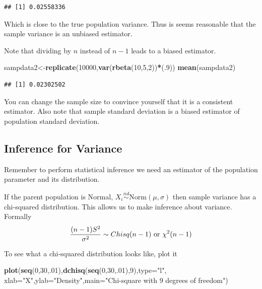 \documentclass[]{book}
\newenvironment{Shaded}{\begin{snugshade}}{\end{snugshade}}
\newcommand{\KeywordTok}[1]{\textcolor[rgb]{0.13,0.29,0.53}{\textbf{#1}}}
\newcommand{\DataTypeTok}[1]{\textcolor[rgb]{0.13,0.29,0.53}{#1}}
\newcommand{\DecValTok}[1]{\textcolor[rgb]{0.00,0.00,0.81}{#1}}
\newcommand{\StringTok}[1]{\textcolor[rgb]{0.31,0.60,0.02}{#1}}
\newcommand{\OperatorTok}[1]{\textcolor[rgb]{0.81,0.36,0.00}{\textbf{#1}}}
\newcommand{\NormalTok}[1]{#1}
\theoremstyle{definition}
\theoremstyle{definition}
\theoremstyle{definition}
\theoremstyle{remark}
\begin{document}
\begin{verbatim}
## [1] 0.02558336
\end{verbatim}

Which is close to the true population variance. Thus is seems reasonable
that the sample variance is an unbiased estimator.

Note that dividing by \(n\) instead of \(n-1\) leads to a biased
estimator.

\begin{Shaded}
\begin{Highlighting}[]
\NormalTok{sampdata2<-}\KeywordTok{replicate}\NormalTok{(}\DecValTok{10000}\NormalTok{,}\KeywordTok{var}\NormalTok{(}\KeywordTok{rbeta}\NormalTok{(}\DecValTok{10}\NormalTok{,}\DecValTok{5}\NormalTok{,}\DecValTok{2}\NormalTok{))}\OperatorTok{*}\NormalTok{(.}\DecValTok{9}\NormalTok{))}
\KeywordTok{mean}\NormalTok{(sampdata2)}
\end{Highlighting}
\end{Shaded}

\begin{verbatim}
## [1] 0.02302502
\end{verbatim}

You can change the sample size to convince yourself that it is a
consistent estimator. Also note that sample standard deviation is a
biased estimator of population standard deviation.

\subsection{Inference for Variance}\label{inference-for-variance}

Remember to perform statistical inference we need an estimator of the
population parameter and its distribution.

If the parent population is Normal,
\(X_{i}\overset{iid}{\sim}\mbox{Norm}(\mu,\sigma)\) then sample variance
has a chi-squared distribution. This allows us to make inference about
variance. Formally
\[{(n-1)S^{2} \over \sigma ^{2}} \sim Chisq(n-1) \mbox{ or } \chi^{2}(n-1)\]

To see what a chi-squared distribution looks like, plot it

\begin{Shaded}
\begin{Highlighting}[]
\KeywordTok{plot}\NormalTok{(}\KeywordTok{seq}\NormalTok{(}\DecValTok{0}\NormalTok{,}\DecValTok{30}\NormalTok{,.}\DecValTok{01}\NormalTok{),}\KeywordTok{dchisq}\NormalTok{(}\KeywordTok{seq}\NormalTok{(}\DecValTok{0}\NormalTok{,}\DecValTok{30}\NormalTok{,.}\DecValTok{01}\NormalTok{),}\DecValTok{9}\NormalTok{),}\DataTypeTok{type=}\StringTok{"l"}\NormalTok{,}
     \DataTypeTok{xlab=}\StringTok{"X"}\NormalTok{,}\DataTypeTok{ylab=}\StringTok{"Density"}\NormalTok{,}\DataTypeTok{main=}\StringTok{"Chi-square with 9 degrees of freedom"}\NormalTok{)}
\end{Highlighting}
\end{Shaded}
\end{document}
